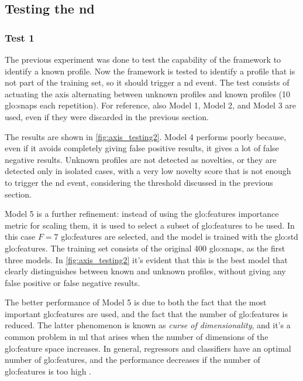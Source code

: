 \subsection{Testing the \gls{nd}}
\subsubsection{Test 1}
The previous experiment was done to test the capability of the framework to identify a known profile. Now the framework is tested to identify a profile that is not part of the training set, so it should trigger a \gls{nd} event. The test consists of actuating the axis alternating between unknown profiles and known profiles (10 \gls{glo:snap}s each repetition). For reference, also Model 1, Model 2, and Model 3 are used, even if they were discarded in the previous section. 

The results are shown in \autoref{fig:axis_testing2}. Model 4 performs poorly because, even if it avoids completely giving false positive results, it gives a lot of false negative results. Unknown profiles are not detected as novelties, or they are detected only in isolated cases, with a very low novelty score that is not enough to trigger the \gls{nd} event, considering the threshold discussed in the previous section.

Model 5 is a further refinement: instead of using the \gls{glo:feature}s importance metric for scaling them, it is used to select a subset of \gls{glo:feature}s to be used. In this case $F=7$ \gls{glo:feature}s are selected, and the model is trained with the \gls{glo:std} \gls{glo:feature}s. The training set consists of the original 400 \gls{glo:snap}s, as the first three models. In \autoref{fig:axis_testing2} it's evident that this is the best model that clearly distinguishes between known and unknown profiles, without giving any false positive or false negative results.

The better performance of Model 5 is due to both the fact that the most important \gls{glo:feature}s are used, and the fact that the number of \gls{glo:feature}s is reduced. The latter phenomenon is known as \emph{curse of dimensionality}, and it's a common problem in \gls{ml} that arises when the number of dimensions of the \gls{glo:feature} space increases. In general, regressors and classifiers have an optimal number of \gls{glo:feature}s, and the performance decreases if the number of \gls{glo:feature}s is too high \cite{curse_dim}. 

